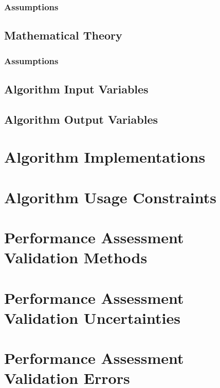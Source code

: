\subsubsection{Assumptions}
\ScientificTheoryAssumptions

\subsection{Mathematical Theory}
\MathematicalTheory

\subsubsection{Assumptions}
\MathematicalTheoryAssumptions

\subsection{Algorithm Input Variables}
\AlgorithmInputVariables

\subsection{Algorithm Output Variables}
\AlgorithmOutputVariables

\section{Algorithm Implementations}
\AlgorithmImplementations

\section{Algorithm Usage Constraints}
\AlgorithmUsageConstraints

\section{Performance Assessment Validation Methods}
\PerformanceAssessmentValidationMethods

\section{Performance Assessment Validation Uncertainties}
\PerformanceAssessmentValidationUncertainties

\section{Performance Assessment Validation Errors}
\PerformanceAssessmentValidationErrors

